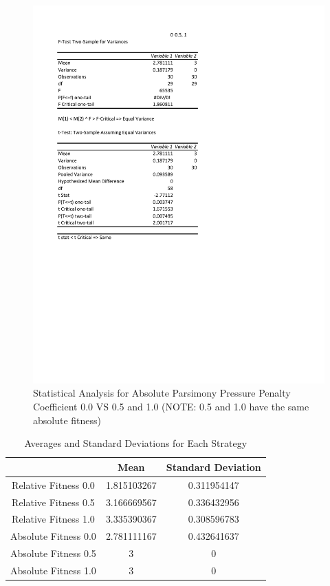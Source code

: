 \documentclass[times]{article}
\begin{document}
	\begin{figure}
		\caption{Statistical Analysis for Absolute Parsimony Pressure Penalty Coefficient 0.0 VS 0.5 and 1.0 (NOTE: 0.5 and 1.0 have the same absolute fitness)}
		\label{fig:stat_abs_012}
		\includegraphics[width=\textwidth]{./pictures/absolute_012.pdf}
	\end{figure}

	\begin{table}
		\centering
		\caption{Averages and Standard Deviations for Each Strategy}
		\label{tab:std_mean}
		\begin{tabular}{| c | c | c |}
			\hline
									& Mean 		& Standard Deviation 	\\
			\hline
			Relative Fitness 0.0	& 1.815103267 & 0.311954147			\\
			\hline
			Relative Fitness 0.5	& 3.166669567 &	0.336432956			\\
			\hline
			Relative Fitness 1.0	& 3.335390367 &	0.308596783			\\
			\hline
			Absolute Fitness 0.0	& 2.781111167 & 0.432641637			\\
			\hline
			Absolute Fitness 0.5	& 3			 & 0					\\
			\hline
			Absolute Fitness 1.0	& 3			 & 0					\\
			\hline
		\end{tabular}
	\end{table}
\end{document}

